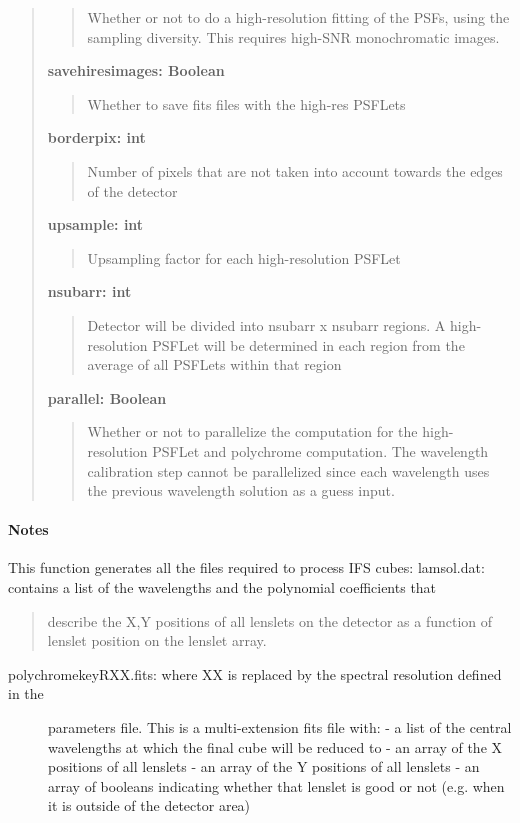 \documentclass[letterpaper,10pt,english]{sphinxmanual}
\begin{document}
\begin{fulllineitems}
\begin{quote}
\begin{description}
\begin{quote}
Whether or not to do a high-resolution fitting of the PSFs, using the sampling
diversity. This requires high-SNR monochromatic images.
\end{quote}

\textbf{savehiresimages: Boolean}
\begin{quote}

Whether to save fits files with the high-res PSFLets
\end{quote}

\textbf{borderpix:  int}
\begin{quote}

Number of pixels that are not taken into account towards the edges of the detector
\end{quote}

\textbf{upsample: int}
\begin{quote}

Upsampling factor for each high-resolution PSFLet
\end{quote}

\textbf{nsubarr: int}
\begin{quote}

Detector will be divided into nsubarr x nsubarr regions. A high-resolution PSFLet
will be determined in each region from the average of all PSFLets within that
region
\end{quote}

\textbf{parallel: Boolean}
\begin{quote}

Whether or not to parallelize the computation for the high-resolution PSFLet and
polychrome computation. The wavelength calibration step cannot be parallelized since
each wavelength uses the previous wavelength solution as a guess input.
\end{quote}

\end{description}\end{quote}
\paragraph{Notes}

This function generates all the files required to process IFS cubes:
lamsol.dat: contains a list of the wavelengths and the polynomial coefficients that
\begin{quote}

describe the X,Y positions of all lenslets on the detector as a function 
of lenslet position on the lenslet array.
\end{quote}
\begin{description}
\item[{polychromekeyRXX.fits:  where XX is replaced by the spectral resolution defined in the}] \leavevmode
parameters file. This is a multi-extension fits file with: 
- a list of the central wavelengths at which the final cube will be reduced to
- an array of the X positions of all lenslets
- an array of the Y positions of all lenslets
- an array of booleans indicating whether that lenslet is good or not
(e.g. when it is outside of the detector area)


\end{description}
\end{fulllineitems}
\end{document}
